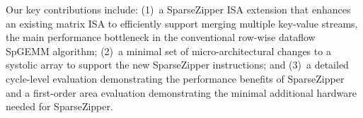  Our key contributions include: (1)~a SparseZipper
ISA extension that enhances an existing matrix ISA to efficiently support
merging multiple key-value streams, the main performance bottleneck in
the conventional row-wise dataflow SpGEMM algorithm; (2)~a minimal set of
micro-architectural changes to a systolic array to support the new
SparseZipper instructions; and (3)~a detailed cycle-level evaluation
demonstrating the performance benefits of SparseZipper and a first-order
area evaluation demonstrating the minimal additional hardware needed for
SparseZipper.

%
%
%
